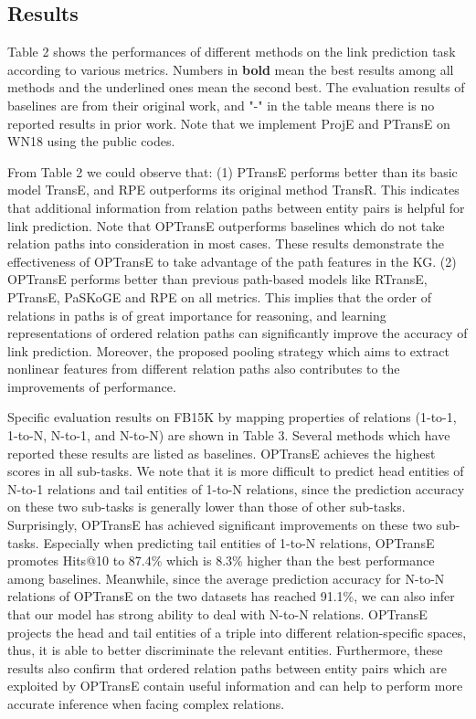 \documentclass[11pt,a4paper]{article}
\begin{document}
\subsection{Results}
Table 2 shows the performances of different methods on the link
prediction task according to various metrics. Numbers in \textbf{bold} mean the best results among all methods and the underlined ones mean the second best. The evaluation results
of baselines are from their original work, and "-" in the table
means there is no reported results in prior work. Note that we implement ProjE and PTransE on WN18 using the public codes.

From Table 2 we
could observe that: (1) PTransE performs better than its basic model
TransE, and RPE outperforms its original method TransR. This
indicates that additional information from relation paths between
entity pairs is helpful for link prediction. Note that OPTransE
outperforms baselines which do not take relation paths into
consideration in most cases. These results demonstrate the
effectiveness of OPTransE to take advantage of the path features in
the KG. (2) OPTransE performs better than previous path-based models
like RTransE, PTransE, PaSKoGE and RPE on all metrics. This implies
that the order of relations in paths is of great importance for
reasoning, and learning representations of ordered relation paths
can significantly improve the accuracy of link prediction. Moreover,
the proposed pooling strategy which aims to extract nonlinear
features from different relation paths also contributes to the
improvements of performance.

Specific evaluation results on FB15K by mapping properties of
relations (1-to-1, 1-to-N, N-to-1, and N-to-N) are shown in Table 3.
Several methods which have reported these results are listed as
baselines. OPTransE achieves the highest scores in all sub-tasks. We
note that it is more difficult to predict head entities of N-to-1
relations and tail entities of 1-to-N relations, since the
prediction accuracy on these two sub-tasks is generally lower than
those of other sub-tasks. Surprisingly, OPTransE has achieved
significant improvements on these two sub-tasks. Especially when
predicting tail entities of 1-to-N relations, OPTransE promotes
Hits@10 to 87.4\% which is 8.3\% higher than the best performance
among baselines. Meanwhile, since the average prediction accuracy
for N-to-N relations of OPTransE on the two datasets has reached
91.1\%, we can also infer that our model has strong ability to deal
with N-to-N relations. OPTransE projects the head and tail entities
of a triple into different relation-specific spaces, thus, it is
able to better discriminate the relevant entities. Furthermore,
these results also confirm that ordered relation paths between
entity pairs which are exploited by OPTransE contain useful
information and can help to perform more accurate inference when
facing complex relations.
\end{document}
